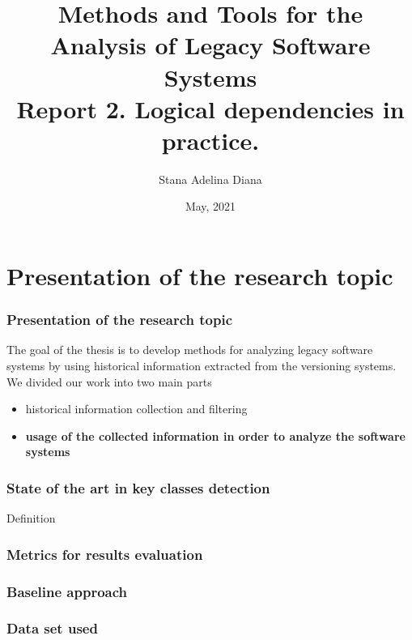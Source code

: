 \documentclass{beamer}
\title[Pres]{Methods and Tools for the Analysis of Legacy Software
Systems\\
Report 2. Logical dependencies in practice.
 }
\author{Stana Adelina Diana}
\institute{Computer Science and Engineering Department\\
"Politehnica" University of Timisoara}
\date{May, 2021}
\begin{document}
\begin{frame}
  \titlepage
\end{frame}

\section{Presentation of the research topic}
 \begin{frame}
\frametitle{Presentation of the research topic}
The goal of the thesis is to develop methods for analyzing legacy software systems by using historical information extracted from the versioning systems.
We divided our work into two main parts

\begin{itemize}
\item historical information collection and filtering
\item \textbf{usage of the collected information in order to analyze the software systems}
\end{itemize}

\end{frame}


 \begin{frame}
\frametitle{State of the art in key classes detection}
\begin{block}{Definition}

\end{block}
 

\end{frame}


 \begin{frame}
\frametitle{Metrics for results evaluation}
 

\end{frame}


 \begin{frame}
\frametitle{Baseline approach}
 

\end{frame}


 \begin{frame}
\frametitle{Data set used}
 

\end{frame}
\end{document}
